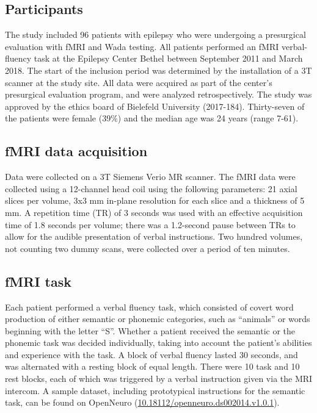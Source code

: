 \documentclass[fleqn,10pt]{SelfArx} %
\begin{document}
\subsection{Participants} \label{Participants}
The study included 96 patients with epilepsy who were undergoing a presurgical evaluation with fMRI and Wada testing. All patients performed an fMRI verbal-fluency task at the Epilepsy Center Bethel between September 2011 and March 2018. The start of the inclusion period was determined by the installation of a 3T scanner at the study site. All data were acquired as part of the center’s presurgical evaluation program, and were analyzed retrospectively. The study was approved by the ethics board of Bielefeld University (2017-184). Thirty-seven of the patients were female (39\%) and the median age was 24 years (range 7-61).

\subsection{fMRI data acquisition} \label{fMRI data acquisition}
Data were collected on a 3T Siemens Verio MR scanner. The fMRI data were collected using a 12-channel head coil using the following parameters: 21 axial slices per volume, 3x3 mm in-plane resolution for each slice and a thickness of 5 mm. A repetition time (TR) of 3 seconds was used with an effective acquisition time of 1.8 seconds per volume; there was a 1.2-second pause between TRs to allow for the audible presentation of verbal instructions. Two hundred volumes, not counting two dummy scans, were collected over a period of ten minutes.

\subsection{fMRI task} \label{fMRI task}
Each patient performed a verbal fluency task, which consisted of covert word production of either semantic or phonemic categories, such as “animals” or words beginning with the letter “S”. Whether a patient received the semantic or the phonemic task was decided individually, taking into account the patient's abilities and experience with the task. A block of verbal fluency lasted 30 seconds, and was alternated with a resting block of equal length. There were 10 task and 10 rest blocks, each of which was triggered by a verbal instruction given via the MRI intercom. A sample dataset, including prototypical instructions for the semantic task, can be found on OpenNeuro (\href{https://dx.doi.org/10.18112/openneuro.ds002014.v1.0.1}{10.18112/openneuro.ds002014.v1.0.1}).
\end{document}
